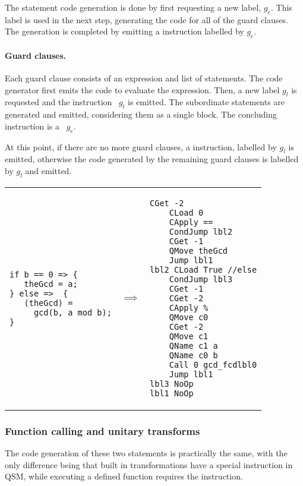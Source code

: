 The statement code generation is done by first requesting a new label, $g_e$.
This label is used in the next step,  generating the 
code for all of the guard clauses. The generation is completed by emitting a 
 instruction labelled by $g_e$.

\paragraph{Guard clauses.}\label{para:guardclauses} 
Each guard clause consists of an expression and
list of statements. The code generator first emits
 the code to evaluate the expression. 
Then, a new label $g_l$ is requested and the instruction ~$g_l$
is emitted. The subordinate statements are generated and emitted, 
considering them as a 
single block. The concluding instruction is a ~$g_e$.

At this point, if there are no more guard clauses, a  instruction,
labelled by $g_l$ is emitted, otherwise the code generated by the remaining
guard clauses is labelled by $g_l$ and emitted.

\begin{center}
\begin{tabular}{p{2in}p{.3in}p{2.5in}}
{\begin{singlespace}
\begin{lstlisting}[style=linqpl]
if b == 0 => { 
   theGcd = a;
} else =>  { 
   (theGcd) = 
     gcd(b, a mod b);
}
\end{lstlisting}
\end{singlespace}}
 & { \qquad \qquad \quad \quad \qquad \qquad $\implies$} &
{\begin{singlespace}
\begin{lstlisting}[style=linqpl]
    CGet -2
    CLoad 0
    CApply ==
    CondJump lbl2
    CGet -1
    QMove theGcd
    Jump lbl1
lbl2 CLoad True //else
    CondJump lbl3
    CGet -1
    CGet -2
    CApply %
    QMove c0
    CGet -2
    QMove c1
    QName c1 a
    QName c0 b
    Call 0 gcd_fcdlbl0
    Jump lbl1
lbl3 NoOp
lbl1 NoOp
\end{lstlisting}
\end{singlespace}}
\end{tabular}
\end{center}


\subsubsection{Function calling and unitary transforms}\label{subsubsec:cgfunctioncalls}
The code generation of these two statements is practically the same, with
the only difference being that built in transformations have a special
instruction in QSM, while executing a defined function requires
the  instruction.

